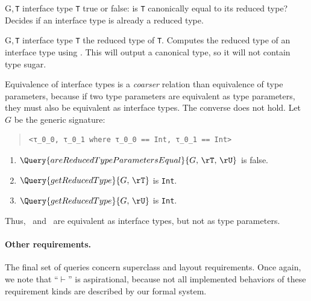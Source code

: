 \documentclass[../generics]{subfiles}
\begin{document}
\begin{itemize}
{G,\,\texttt{T}}
{interface type \texttt{T}}
{true or false: is \texttt{T} canonically equal to its reduced type?}
{Decides if an interface type is already a reduced type.}

{G,\,\texttt{T}}
{interface type \texttt{T}}
{the reduced type of \texttt{T}.}
{Computes the reduced type of an interface type using . This will output a canonical type, so it will not contain type sugar.}
\end{itemize}

\begin{example}
Equivalence of interface types is a \emph{coarser} relation than equivalence of type parameters, because if two type parameters are equivalent as type parameters, they must also be equivalent as interface types. The converse does not hold. Let~$G$ be the generic signature:
\begin{quote}
\begin{verbatim}
<τ_0_0, τ_0_1 where τ_0_0 == Int, τ_0_1 == Int>
\end{verbatim}
\end{quote}
\begin{enumerate}
\item $\Query{areReducedTypeParametersEqual}{G,\,\rT,\,\rU}$ is false.
\item $\Query{getReducedType}{G,\,\rT}$ is \texttt{Int}.
\item $\Query{getReducedType}{G,\,\rU}$ is \texttt{Int}.
\end{enumerate}
Thus, \rT\ and \rU\ are equivalent as interface types, but not as type parameters.
\end{example}

\paragraph{Other requirements.} The final set of queries concern superclass and layout requirements. Once again, we note that ``$\vdash$'' is aspirational, because not all implemented behaviors of these requirement kinds are described by our formal system.
\end{document}
